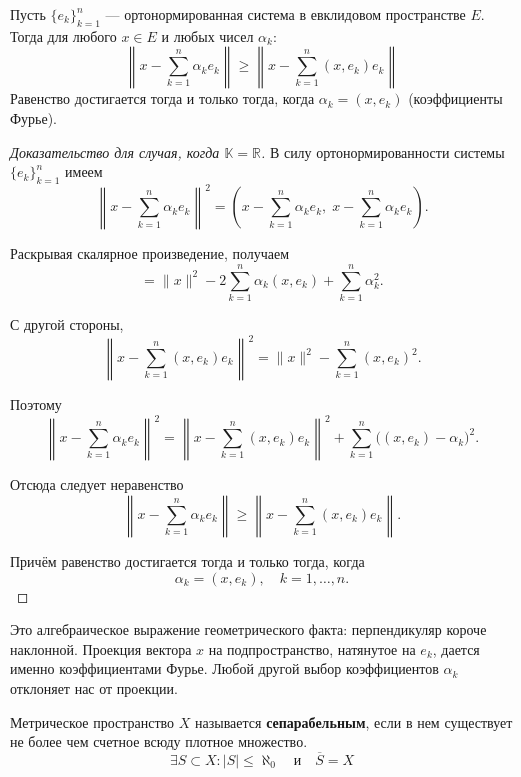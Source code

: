\begin{proposition}\label{minproperty}
	Пусть $\{e_k\}_{k=1}^n$ --- ортонормированная система в евклидовом пространстве $E$. Тогда для любого $x \in E$ и любых чисел $\alpha_k$:
	\[\left\|x - \sum_{k = 1}^n \alpha_ke_k\right\| \geqslant \left\|x - \sum_{k = 1}^n (x, e_k)e_k\right\|\]
	Равенство достигается тогда и только тогда, когда $\alpha_k = (x, e_k)$ (коэффициенты Фурье).
\end{proposition}

\begin{proof}
	[Доказательство для случая, когда $\mathbb{K}=\mathbb{R}$]
	В силу ортонормированности системы $\{e_k\}_{k=1}^n$ имеем
	$$
	\left\|x-\sum_{k=1}^n \alpha_k e_k\right\|^2
	=
	\left(
	x-\sum_{k=1}^n \alpha_k e_k,\;
	x-\sum_{k=1}^n \alpha_k e_k
	\right).
	$$
	
	Раскрывая скалярное произведение, получаем
	$$
	=
	\|x\|^2
	-2\sum_{k=1}^n \alpha_k (x,e_k)
	+\sum_{k=1}^n \alpha_k^2.
	$$
	
	С другой стороны,
	$$
	\left\|x-\sum_{k=1}^n (x,e_k)e_k\right\|^2
	=
	\|x\|^2-\sum_{k=1}^n (x,e_k)^2.
	$$
	
	Поэтому
	$$
	\left\|x-\sum_{k=1}^n \alpha_k e_k\right\|^2
	=
	\left\|x-\sum_{k=1}^n (x,e_k)e_k\right\|^2
	+\sum_{k=1}^n\big((x,e_k)-\alpha_k\big)^2.
	$$
	
	Отсюда следует неравенство
	$$
	\left\|x-\sum_{k=1}^n \alpha_k e_k\right\|
	\ge
	\left\|x-\sum_{k=1}^n (x,e_k)e_k\right\|.
	$$
	
	Причём равенство достигается тогда и только тогда, когда
	$$
	\alpha_k=(x,e_k),\quad k=1,\dots,n.
	$$
\end{proof}

\begin{idea}
	Это алгебраическое выражение геометрического факта: перпендикуляр короче наклонной. Проекция вектора $x$ на подпространство, натянутое на $e_k$, дается именно коэффициентами Фурье. Любой другой выбор коэффициентов $\alpha_k$ отклоняет нас от проекции.
\end{idea}

\begin{definition}\label{separability}
	Метрическое пространство $X$ называется \textbf{сепарабельным}, если в нем существует не более чем счетное всюду плотное множество.
	\[ \exists S \subset X : |S| \le \aleph_0 \quad \text{и} \quad \overline{S} = X \]
\end{definition}

